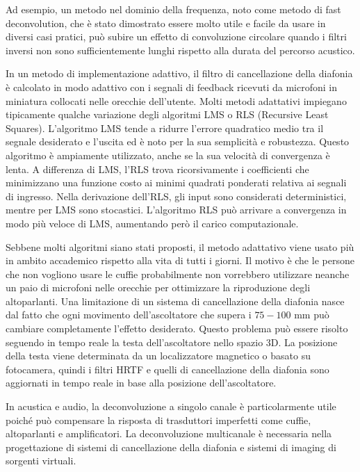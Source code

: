 \documentclass[12pt,a4paper,titlepage]{article}
\begin{document}
Ad esempio, un metodo nel dominio della frequenza, noto come metodo di fast deconvolution, che è stato dimostrato essere molto utile e facile da usare in diversi casi pratici, può subire un effetto di convoluzione circolare quando
i filtri inversi non sono sufficientemente lunghi rispetto alla durata del percorso acustico.

In un metodo di implementazione adattivo, il filtro di cancellazione della  diafonia è calcolato in modo adattivo con i segnali di feedback ricevuti da
microfoni in miniatura collocati nelle orecchie dell'utente. Molti metodi adattativi impiegano tipicamente qualche variazione degli algoritmi LMS o RLS (Recursive Least Squares). L'algoritmo LMS tende a ridurre l'errore quadratico medio tra il segnale desiderato e l'uscita ed è noto per la sua semplicità e robustezza. Questo algoritmo è ampiamente utilizzato, anche se la sua velocità di convergenza è lenta. A differenza di LMS, l'RLS trova ricorsivamente i coefficienti che minimizzano una funzione costo ai minimi quadrati ponderati relativa ai segnali di ingresso. Nella derivazione dell'RLS, gli input sono considerati deterministici, mentre per LMS sono stocastici. L'algoritmo RLS può arrivare a convergenza in modo più veloce di LMS, aumentando però il carico computazionale.

Sebbene molti algoritmi siano stati proposti, il metodo adattativo viene usato più in ambito accademico rispetto alla vita di tutti i giorni. Il motivo è che le persone che non vogliono usare le cuffie probabilmente non vorrebbero utilizzare neanche un paio di microfoni nelle orecchie per ottimizzare la riproduzione degli altoparlanti. Una limitazione di un sistema di cancellazione della diafonia nasce dal fatto che ogni movimento dell'ascoltatore che supera i $75-100$ \si{\milli \meter} può cambiare completamente l'effetto desiderato. Questo problema può essere risolto seguendo in tempo reale la testa dell'ascoltatore nello spazio 3D. La posizione della testa viene determinata da un localizzatore magnetico o basato su fotocamera, quindi i filtri HRTF e quelli di cancellazione della diafonia sono aggiornati in tempo reale in base alla posizione dell'ascoltatore.

In acustica e audio, la deconvoluzione a singolo canale è particolarmente utile poiché può compensare la risposta di trasduttori imperfetti come cuffie, altoparlanti e amplificatori. La deconvoluzione multicanale è necessaria nella progettazione di sistemi di cancellazione della diafonia e sistemi di imaging di sorgenti virtuali.%
\end{document}
